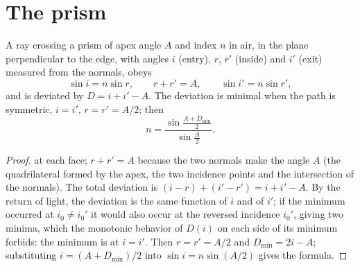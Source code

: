 \section{The prism}

\begin{proposition}\label{prop:b1:rays-reflection-refraction:prism}
A ray crossing a prism of apex angle $A$ and index $n$ in air, in the
plane perpendicular to the edge, with angles $i$ (entry), $r$, $r'$
(inside) and $i'$ (exit) measured from the normals, obeys
\[
\sin i = n \sin r, \qquad r + r' = A, \qquad \sin i' = n \sin r',
\]
and is deviated by $D = i + i' - A$. The deviation is minimal when the
path is symmetric, $i = i'$, $r = r' = A/2$; then
\[
n = \frac{\sin\frac{A + D_{\min}}{2}}{\sin\frac{A}{2}} .
\]
\end{proposition}

\begin{proof}
 at each face; $r + r' = A$ because the two normals make the
angle $A$ (the quadrilateral formed by the apex, the two incidence
points and the intersection of the normals). The total deviation is
$(i - r) + (i' - r') = i + i' - A$. By the return of light, the
deviation is the same function of $i$ and of $i'$; if the minimum
occurred at $i_0 \neq i_0'$ it would also occur at the reversed
incidence $i_0'$, giving two minima, which the monotonic behavior of
$D(i)$ on each side of its minimum forbids: the minimum is at $i = i'$.
Then $r = r' = A/2$ and $D_{\min} = 2i - A$; substituting $i = (A +
D_{\min})/2$ into $\sin i = n\sin(A/2)$ gives the formula.
\end{proof}

